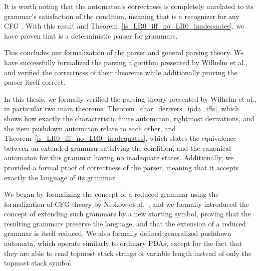 \begin{isabellebody}
\begin{isamarkuptext}
It is worth noting that the automaton's correctness is completely unrelated to its grammar's
satisfaction of the  condition, meaning that  is a recognizer for any
CFG . With this result and Theorem~\ref{is_LR0_iff_no_LR0_inadequates}, we have proven
that  is a deterministic parser for  grammars. 

This concludes our formalization of the  parser and general  parsing 
theory. We have successfully formalized the parsing algorithm presented by Wilhelm et al., and
verified the correctness of their theorems while additionally proving the parser itself correct.%
\end{isamarkuptext}\isamarkuptrue%
%
\isadelimdocument
%
\endisadelimdocument
%
\isatagdocument
%
\isamarkuptrue%
%
\isamarkuptrue%
%
\endisatagdocument
{\isafolddocument}%
%
\isadelimdocument
%
\endisadelimdocument
%
\begin{isamarkuptext}%
In this thesis, we formally verified the  parsing theory presented by Wilhelm et al., 
in particular two main theorems: Theorem~\ref{char_derivers_ipda_iffs}, which shows how exactly the 
characteristic finite automaton, rightmost derivations, and the item pushdown automaton relate to
each other, and Theorem~\ref{is_LR0_iff_no_LR0_inadequates}, which states the equivalence between an
extended grammar satisfying the  condition, and the canonical  automaton for this grammar
having no  inadequate states. Additionally, we provided a formal proof of correctness of the
 parser, meaning that it accepts exactly the language of its grammar.

We began by formalizing the concept of a reduced grammar using the formalization of CFG theory by
Nipkow et al.~\cite{Nipkow-AFP, Nipkow-Paper}, and we formally introduced the concept of
extending such grammars by a new starting symbol, proving that the resulting grammars preserve the
language, and that the extension of a reduced grammar is itself reduced. We also formally defined generalized pushdown automata, which
operate similarly to ordinary PDAs, except for the fact that they are able to read topmost stack
strings of variable length instead of only the topmost stack symbol.


\end{isamarkuptext}
\end{isabellebody}
